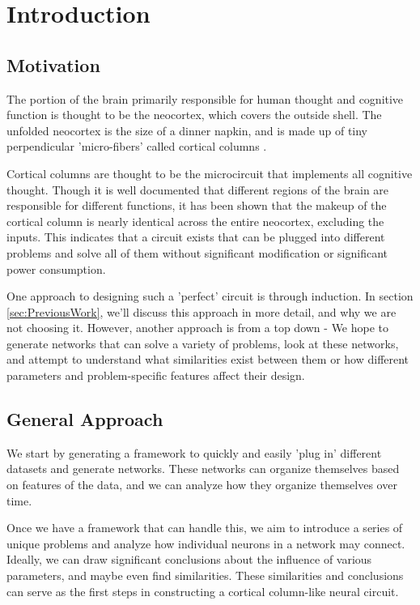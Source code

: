 \section{Introduction} \label{sec:Introduction}

\subsection{Motivation}

The portion of the brain primarily responsible for human thought and cognitive
function is thought to be the neocortex, which covers the outside shell. The
unfolded neocortex is the size of a dinner napkin, and is made up of tiny
perpendicular 'micro-fibers' called cortical columns \cite{Mountcastle}.

Cortical columns are thought to be the microcircuit that implements all
cognitive thought. Though it is well documented that different regions of the
brain are responsible for different functions, it has been shown \cite{Hawkins}
that the makeup of the cortical column is nearly identical across the entire
neocortex, excluding the inputs. This indicates that a circuit exists that can
be plugged into different problems and solve all of them without significant
modification or significant power consumption.

One approach to designing such a 'perfect' circuit is through induction. In
section \ref{sec:PreviousWork}, we'll discuss this approach in more detail, and
why we are not choosing it. However, another approach is from a top down - We
hope to generate networks that can solve a variety of problems, look at these
networks, and attempt to understand what similarities exist between them or how
different parameters and problem-specific features affect their design.

\subsection{General Approach}

We start by generating a framework to quickly and easily 'plug in' different
datasets and generate networks. These networks can organize themselves based on
features of the data, and we can analyze how they organize themselves over time.

Once we have a framework that can handle this, we aim to introduce a series of
unique problems and analyze how individual neurons in a network may connect.
Ideally, we can draw significant conclusions about the influence of various
parameters, and maybe even find similarities. These similarities and conclusions
can serve as the first steps in constructing a cortical column-like neural
circuit.